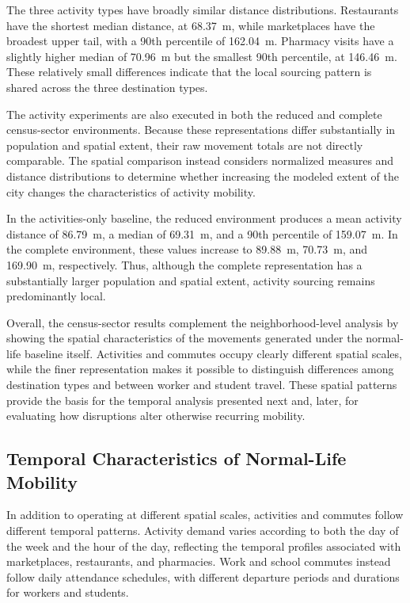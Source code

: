 The three activity types have broadly similar distance distributions. Restaurants have the shortest median distance, at 68.37~m, while marketplaces have the broadest upper tail, with a 90th percentile of 162.04~m. Pharmacy visits have a slightly higher median of 70.96~m but the smallest 90th percentile, at 146.46~m. These relatively small differences indicate that the local sourcing pattern is shared across the three destination types.

The activity experiments are also executed in both the reduced and complete census-sector environments. Because these representations differ substantially in population and spatial extent, their raw movement totals are not directly comparable. The spatial comparison instead considers normalized measures and distance distributions to determine whether increasing the modeled extent of the city changes the characteristics of activity mobility.

In the activities-only baseline, the reduced environment produces a mean activity distance of 86.79~m, a median of 69.31~m, and a 90th percentile of 159.07~m. In the complete environment, these values increase to 89.88~m, 70.73~m, and 169.90~m, respectively. Thus, although the complete representation has a substantially larger population and spatial extent, activity sourcing remains predominantly local.

Overall, the census-sector results complement the neighborhood-level analysis by showing the spatial characteristics of the movements generated under the normal-life baseline itself. Activities and commutes occupy clearly different spatial scales, while the finer representation makes it possible to distinguish differences among destination types and between worker and student travel. These spatial patterns provide the basis for the temporal analysis presented next and, later, for evaluating how disruptions alter otherwise recurring mobility.


\subsection{Temporal Characteristics of Normal-Life Mobility}
\label{sec:routine_mobility_temporal}

In addition to operating at different spatial scales, activities and commutes follow different temporal patterns. Activity demand varies according to both the day of the week and the hour of the day, reflecting the temporal profiles associated with marketplaces, restaurants, and pharmacies. Work and school commutes instead follow daily attendance schedules, with different departure periods and durations for workers and students.

